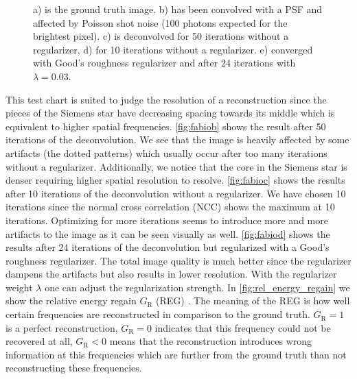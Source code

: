\documentclass{juliacon}
\begin{document}
\begin{figure}[h]
\begin{subfigure}[b]{.16\textwidth}
                \caption{}
                \label{fig:fabiod}
            \end{subfigure}%
            \caption{a) is the ground truth image. b) has been convolved with a PSF and affected by Poisson shot noise (100 photons expected for the brightest pixel). 
            c) is deconvolved for 50 iterations without a regularizer, d) for 10 iterations without a regularizer. e) converged with Good's roughness regularizer and 
                            after 24 iterations with $\lambda=0.03$.}
            \label{fig:image}
        \end{figure}

        This test chart is suited to judge the resolution of a reconstruction since the pieces of the Siemens star
        have decreasing spacing towards its middle which is equivalent to higher spatial frequencies.
        \autoref{fig:fabiob} shows the result after 50 iterations of the deconvolution. 
        We see that the image is heavily affected by some artifacts (the dotted patterns) which usually occur after too many iterations without a regularizer.
        Additionally, we notice that the core in the Siemens star is denser 
        requiring higher spatial resolution to resolve. 
        \autoref{fig:fabioc} shows the results after 10 iterations of the deconvolution without a regularizer.
        We have chosen 10 iterations since the normal cross correlation (NCC) shows the maximum at 10 iterations.
        Optimizing for more iterations seems to introduce more and more artifacts to the image as it can be seen visually as well.
        \autoref{fig:fabiod} shows the results after 24 iterations of the deconvolution but regularized with a Good's roughness regularizer.
        The total image quality is much better since the regularizer dampens the artifacts but also results in lower
        resolution. With the regularizer weight $\lambda$ one can adjust the regularization strength.
        In \autoref{fig:rel_energy_regain} we show the relative energy regain $G_\textrm{R}$ (REG) \cite{rel_energy_regain}.
        The meaning of the REG is how well certain frequencies are reconstructed in comparison
        to the ground truth. $G_\textrm{R} = 1$ is a perfect reconstruction, $G_\textrm{R} = 0$ indicates that 
        this frequency could not be recovered at all, $G_\textrm{R} < 0$ means that the reconstruction introduces 
        wrong information at this frequencies
        which are further from the ground truth than not reconstructing these frequencies. 
\end{document}
